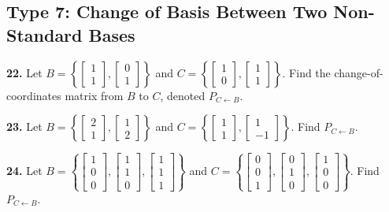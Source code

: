 \documentclass{article}
\begin{document}
\subsection*{Type 7: Change of Basis Between Two Non-Standard Bases}
\textbf{22.} Let $B = \left\{ \begin{bmatrix} 1 \\ 1 \end{bmatrix}, \begin{bmatrix} 0 \\ 1 \end{bmatrix} \right\}$ and $C = \left\{ \begin{bmatrix} 1 \\ 0 \end{bmatrix}, \begin{bmatrix} 1 \\ 1 \end{bmatrix} \right\}$. Find the change-of-coordinates matrix from $B$ to $C$, denoted $P_{C \leftarrow B}$.

\vspace{0.2cm}
\textbf{23.} Let $B = \left\{ \begin{bmatrix} 2 \\ 1 \end{bmatrix}, \begin{bmatrix} 1 \\ 2 \end{bmatrix} \right\}$ and $C = \left\{ \begin{bmatrix} 1 \\ 1 \end{bmatrix}, \begin{bmatrix} 1 \\ -1 \end{bmatrix} \right\}$. Find $P_{C \leftarrow B}$.

\vspace{0.2cm}
\textbf{24.} Let $B = \left\{ \begin{bmatrix} 1 \\ 0 \\ 0 \end{bmatrix}, \begin{bmatrix} 1 \\ 1 \\ 0 \end{bmatrix}, \begin{bmatrix} 1 \\ 1 \\ 1 \end{bmatrix} \right\}$ and $C = \left\{ \begin{bmatrix} 0 \\ 0 \\ 1 \end{bmatrix}, \begin{bmatrix} 0 \\ 1 \\ 0 \end{bmatrix}, \begin{bmatrix} 1 \\ 0 \\ 0 \end{bmatrix} \right\}$. Find $P_{C \leftarrow B}$.
\end{document}
